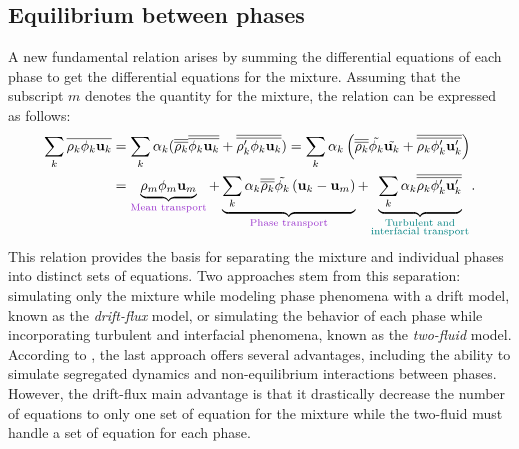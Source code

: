 \subsection{Equilibrium between phases}

A new fundamental relation arises by summing the differential equations of each phase to get the differential equations for the mixture. Assuming that the subscript $m$ denotes the quantity for the mixture, the relation can be expressed as follows:
\begin{equation}\label{mixtureeq}
  \begin{aligned}
   \sum_k \overline{\rho_k \phi_k \mathbf{u}_k} &= \sum_k \alpha_k(\overline{\overline{\rho_k}}\overline{\overline{\phi_k \mathbf{u}_k}}+\overline{\overline{\rho_k' \phi_k \mathbf{u}_k}}) = \sum_k \alpha_k\parent{\overline{\overline{\rho_k}}\tilde{\phi_k} \tilde{\mathbf{u}_k}+\overline{\overline{\rho_k \phi_k' \mathbf{u}_k'}}}\\ &=\underbrace{\rho_m\phi_m \mathbf{u}_m}_{\color{mydarkorchid}\text{Mean transport}} + \underbrace{\sum_k\alpha_k\overline{\overline{\rho_k}}\tilde{\phi_k}\parent{\mathbf{u}_k-\mathbf{u}_m}}_{\color{mydarkorchid}\text{Phase transport}} + \underbrace{\sum_k\alpha_k\overline{\overline{\rho_k\phi_k'\mathbf{u}_k'}}}_{\color{myteal}\substack{\text{Turbulent and}\\\text{interfacial transport}}}.
   \end{aligned}
\end{equation}
This relation provides the basis for separating the mixture and individual phases into distinct sets of equations. Two approaches stem from this separation: simulating only the mixture while modeling phase phenomena with a drift model, known as the \emph{drift-flux} model, or simulating the behavior of each phase while incorporating turbulent and interfacial phenomena, known as the \emph{two-fluid} model. According to \textcite{LivreIH}, the last approach offers several advantages, including the ability to simulate segregated dynamics and non-equilibrium interactions between phases. However, the drift-flux main advantage is that it drastically decrease the number of equations to only one set of equation for the mixture while the two-fluid must handle a set of equation for each phase.

